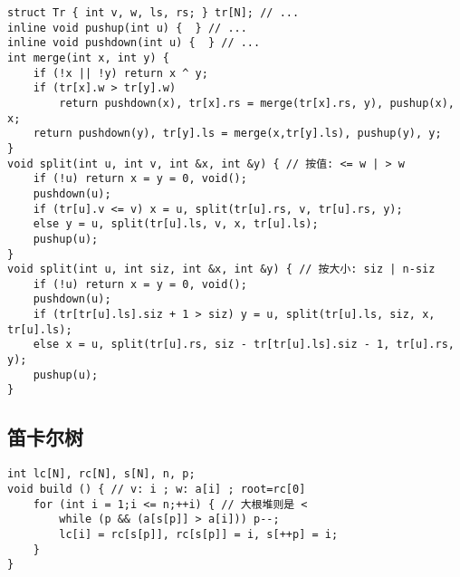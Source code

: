 \documentclass[a4paper,landscape,twocolumn]{ctexart}
\begin{document}
\begin{lstlisting}
struct Tr { int v, w, ls, rs; } tr[N]; // ...
inline void pushup(int u) {  } // ...
inline void pushdown(int u) {  } // ...
int merge(int x, int y) {
	if (!x || !y) return x ^ y;
	if (tr[x].w > tr[y].w)
		return pushdown(x), tr[x].rs = merge(tr[x].rs, y), pushup(x), x;
	return pushdown(y), tr[y].ls = merge(x,tr[y].ls), pushup(y), y;
}
void split(int u, int v, int &x, int &y) { // 按值: <= w | > w
	if (!u) return x = y = 0, void();
	pushdown(u);
	if (tr[u].v <= v) x = u, split(tr[u].rs, v, tr[u].rs, y);
	else y = u, split(tr[u].ls, v, x, tr[u].ls);
	pushup(u);
}
void split(int u, int siz, int &x, int &y) { // 按大小: siz | n-siz
	if (!u) return x = y = 0, void();
	pushdown(u);
	if (tr[tr[u].ls].siz + 1 > siz) y = u, split(tr[u].ls, siz, x, tr[u].ls);
	else x = u, split(tr[u].rs, siz - tr[tr[u].ls].siz - 1, tr[u].rs, y);
	pushup(u);
}
\end{lstlisting}

\subsection{笛卡尔树}

\begin{lstlisting}
int lc[N], rc[N], s[N], n, p;
void build () { // v: i ; w: a[i] ; root=rc[0]
	for (int i = 1;i <= n;++i) { // 大根堆则是 <
		while (p && (a[s[p]] > a[i])) p--;
		lc[i] = rc[s[p]], rc[s[p]] = i, s[++p] = i;
	}
}
\end{lstlisting}

%
%
\end{document}
